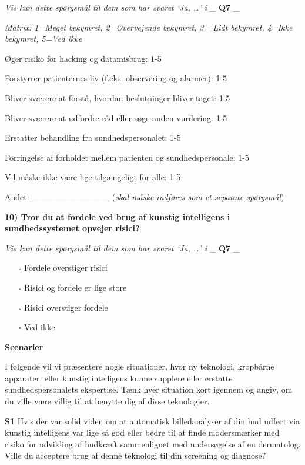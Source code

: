 \documentclass[
]{article}
\providecommand{\tightlist}{%
  \setlength{\itemsep}{0pt}\setlength{\parskip}{0pt}}
\begin{document}
\emph{Vis kun dette spørgsmål til dem som har svaret `Ja, \ldots{}' i}
\_ \textbf{Q7} \_

\emph{Matrix: 1=Meget bekymret, 2=Overvejende bekymret, 3= Lidt
bekymret, 4=Ikke bekymret, 5=Ved ikke}

Øger risiko for hacking og datamisbrug: 1-5

Forstyrrer patienternes liv (f.eks. observering og alarmer): 1-5

Bliver sværere at forstå, hvordan beslutninger bliver taget: 1-5

Bliver sværere at udfordre råd eller søge anden vurdering: 1-5

Erstatter behandling fra sundhedspersonalet: 1-5

Forringelse af forholdet mellem patienten og sundhedspersonale: 1-5

Vil måske ikke være lige tilgængeligt for alle: 1-5

Andet:\_\_\_\_\_\_\_\_\_\_\_\_\_ (\emph{skal måske indføres som et
separate spørgsmål})

\textbf{10) Tror du at fordele ved brug af kunstig intelligens i
sundhedssystemet opvejer risici?}

\emph{Vis kun dette spørgsmål til dem som har svaret `Ja, \ldots{}' i}
\_ \textbf{Q7} \_

\begin{itemize}
\tightlist
\item[$\square$]
  Fordele overstiger risici
\item[$\square$]
  Risici og fordele er lige store
\item[$\square$]
  Risici overstiger fordele
\item[$\square$]
  Ved ikke
\end{itemize}

\textbf{Scenarier}

I følgende vil vi præsentere nogle situationer, hvor ny teknologi,
kropbårne apparater, eller kunstig intelligens kunne supplere eller
erstatte sundhedspersonalets ekspertise. Tænk hver situation kort
igennem og angiv, om du ville være villig til at benytte dig af disse
teknologier.

\textbf{S1} Hvis der var solid viden om at automatisk billedanalyser af
din hud udført via kunstig intelligens var lige så god eller bedre til
at finde modersmærker med risiko for udvikling af hudkræft sammenlignet
med undersøgelse af en dermatolog. Ville du acceptere brug af denne
teknologi til din screening og diagnose?
\end{document}
